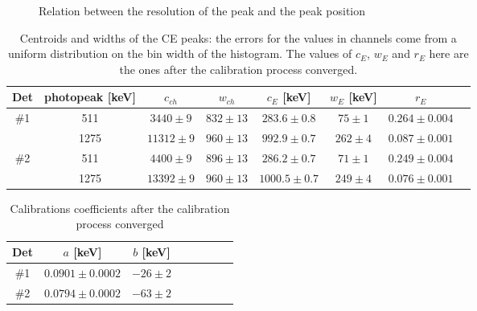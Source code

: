 \documentclass[11pt,a4 paper]{article}
\begin{document}
\begin{figure}[H]
    \centering
    \caption{Relation between the resolution of the peak and the peak position}
    \label{fig:sim}
\end{figure}


\begin{table}[H]
  \centering
  \begin{tabular}{cccccccc}
    \toprule
    Det & photopeak [keV] & $c_{ch}$ & $w_{ch}$ & $c_E$ [keV] & $w_E$ [keV] & $r_E$ \\
    \midrule
    \#1 & 511 & $3440 \pm 9$ & $832 \pm 13$ & $283.6 \pm 0.8$ & $75 \pm 1$ & $0.264 \pm 0.004$ \\
        & 1275 & $11312 \pm 9$ & $960 \pm 13$ & $992.9 \pm 0.7$ & $262 \pm 4$ & $0.087 \pm 0.001$ \\
    \#2 & 511 & $4400 \pm 9$ & $896 \pm 13$ & $286.2 \pm 0.7$ & $71 \pm 1$ & $0.249 \pm 0.004$ \\
        & 1275 & $13392 \pm 9$ & $960 \pm 13$ & $1000.5 \pm 0.7$ & $249 \pm 4$ & $0.076 \pm 0.001$ \\
    \bottomrule
  \end{tabular}
  \caption{Centroids and widths of the CE peaks: the errors for the values in channels come from a uniform distribution on the bin width of the histogram.
  The values of $c_E$, $w_E$ and $r_E$ here are the ones after the calibration process converged.}
  \label{tab:calibr:fits}
\end{table}

\begin{table}[H]
  \centering
  \begin{tabular}{cccccccc}
    \toprule
    Det & $a$ [keV] & $b$ [keV] \\
    \midrule
    \#1 & $0.0901 \pm 0.0002$ & $-26 \pm 2$ \\
    \#2 & $0.0794 \pm 0.0002$ & $-63 \pm 2$ \\
    \bottomrule
  \end{tabular}
  \caption{Calibrations coefficients after the calibration process converged}
  \label{tab:calibr:coeffs}
\end{table}
\end{document}
